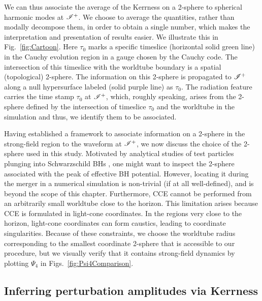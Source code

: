  
 We can thus associate the average of the Kerrness on a 2-sphere to spherical harmonic modes at $\mathscr{I^+}$. We choose to average the quantities, rather than modally decompose them, in order to obtain a single number, which makes the interpretation and presentation of results easier. We illustrate this in Fig.~\ref{fig:Cartoon}. Here $\tau_{0}$ marks a specific timeslice  (horizontal solid green line) in the Cauchy evolution region in a gauge chosen by the Cauchy code. The intersection of this timeslice with the worldtube boundary is a spatial (topological) 2-sphere. The information on this 2-sphere is propagated to $\mathscr{I^+}$ along a null hypersurface labeled (solid purple line) as $\tau_{0}$. The radiation feature carries the time stamp $\tau_{0}$ at $\mathscr{I^+}$, which, roughly speaking, arises from the 2-sphere defined by the intersection of timeslice $\tau_{0}$ and the worldtube in the simulation and thus, we identify them to be associated.  %

Having established a framework to associate information on a 2-sphere in the strong-field region to the waveform at $\mathscr{I^+}$, we now discuss the choice of the 2-sphere used in this study. Motivated by analytical studies of test particles plunging into Schwarzschild BHs \cite{PriceAndPlunge,PriceAndPlunge2}, one might want to inspect the 2-sphere associated with the peak of effective BH potential. However, locating it during the merger in a numerical simulation is non-trivial (if at all well-defined), and is beyond the scope of this chapter. Furthermore, CCE cannot be performed from an arbitrarily small worldtube close to the horizon. This limitation arises because CCE is formulated in light-cone coordinates. In the regions very close to the horizon, light-cone coordinates can form caustics, leading to coordinate singularities. Because of these constraints, we choose the worldtube radius corresponding to the smallest coordinate  2-sphere that is accessible to our procedure, but we visually verify that it contains strong-field dynamics by plotting $\Psi_{4}$ in Figs.~\ref{fig:Psi4Comparison}.

\subsection{Inferring perturbation amplitudes via Kerrness}
\EnvelopesFigure
\KerrPertAmplitudeFigure

